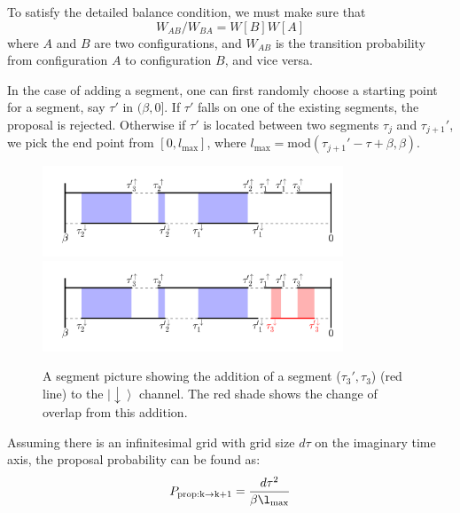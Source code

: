 To satisfy the detailed balance condition, we must make sure that 
\begin{equation}
W_{AB}/W_{BA}=W[B]W[A]
\end{equation}
where $A$ and $B$ are two configurations, and $W_{AB}$ is the transition
probability from configuration $A$ to configuration $B$, and vice versa.

In the case of adding a segment, one can first randomly choose a starting point 
for a segment, say $\tau'$ in $(\beta,0]$. If $\tau'$ falls on one of the 
existing segments, the proposal is rejected. Otherwise if $\tau'$ is located
between two segments $\tau_j$ and $\tau_{j+1}'$, we pick the end point from 
$[0,l_\textrm{max}]$, where $l_\textrm{max}=\mathrm{mod}(\tau_{j+1}'-\tau+\beta,\beta)$.
\begin{figure}[ht]
  \centering
  \includegraphics[width=0.8\textwidth] {img/segment.png}
  \includegraphics[width=0.8\textwidth] {img/segment_add.png}
  \caption{A segment picture showing the addition of a segment ($\tau_3',\tau_3$)
(red line) to the $\left|\downarrow\right\rangle$ channel. The red shade shows the
change of overlap from this addition.
}
\label{fig:seg_add}
\end{figure}
Assuming there is an infinitesimal grid with grid size $d\tau$ on the imaginary
time axis, the proposal probability can be found as:
\begin{equation}
P_\mathrm{prop:k\rightarrow k+1}=\frac{d\tau^2}{\beta\l_\mathrm{max}}
\end{equation}

